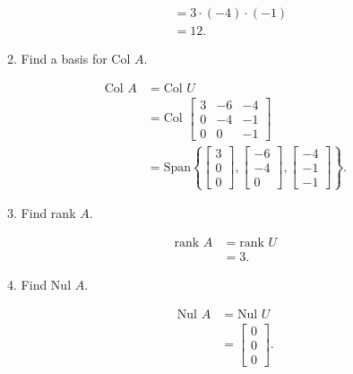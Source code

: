 \documentclass{zc-ust-hw}
\begin{document}
\begin{enumerate}
\begin{enumerate}
\begin{sol}
\begin{align}
            &= 3 \cdot (-4) \cdot (-1) \\
            &= 12
          .\end{align}
        \end{sol}
      \item Find a basis for Col $A$.
        \begin{sol}
          \begin{align}
            \text{Col } A &= \text{Col } U \\
            &= \text{Col } \begin{bmatrix} 3 & -6 & -4 \\ 0 & -4 & -1 \\ 0 & 0 & -1 \end{bmatrix} \\
            &= \text{Span} \left\{ \begin{bmatrix} 3 \\ 0 \\ 0 \end{bmatrix}, \begin{bmatrix} -6 \\ -4 \\ 0 \end{bmatrix}, \begin{bmatrix} -4 \\ -1 \\ -1 \end{bmatrix} \right\}
          .\end{align}
        \end{sol}
      \item Find rank $A$.
        \begin{sol}
          \begin{align}
            \text{rank } A &= \text{rank } U \\
            &= 3
          .\end{align}
        \end{sol}
      \item Find Nul $A$.
        \begin{sol}
          \begin{align}
            \text{Nul } A &= \text{Nul } U \\
                          &= \begin{bmatrix} 0\\0\\0 \end{bmatrix} 
          .\end{align}
        \end{sol}
    \end{enumerate}


\end{enumerate}
\end{document}
